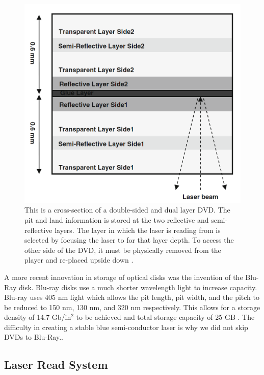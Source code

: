 \documentclass[ notitlepage, numerical, 11pt]{revtex4-1} %
\begin{document}
\begin{figure}[H]
\centerline{\includegraphics[scale=.45]{DVD.png}}
\caption{This is a cross-section of a double-sided and dual layer DVD. The pit and land information is stored at the two reflective and semi-reflective layers. The layer in which the laser is reading from is selected by focusing the laser to for that layer depth. To access the other side of the DVD, it must be physically removed from the player and re-placed upside down \cite{memory}.}
\label{DVD}
\end{figure}

A more recent innovation in storage of optical disks was the invention of the Blu-Ray disk. Blu-ray disks use a much shorter wavelength light to increase capacity. Blu-ray uses 405 nm light which allows the pit length, pit width, and the pitch to be reduced to 150 nm, 130 nm, and 320 nm respectively. This allows for a storage density of 14.7 Gb/in$^2$ to be achieved and total storage capacity of 25 GB \cite{memory}. The difficulty in creating a stable blue semi-conductor laser is why we did not skip DVDs to Blu-Ray..

 


\subsection{Laser Read System}
\end{document}

